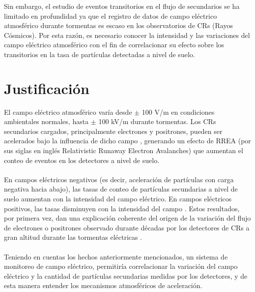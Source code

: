 \documentclass[12pt,a4paper,oneside]{book}
\begin{document}
Sin embargo, el estudio de eventos transitorios en el flujo de secundarios se ha limitado en profundidad ya que el registro de datos de campo eléctrico atmosférico durante tormentas es escaso en los observatorios de CRs (Rayos Cósmicos). Por esta razón, es necesario conocer la intensidad y las variaciones del campo eléctrico atmosférico con el fin de correlacionar su efecto sobre los transitorios en la tasa de partículas detectadas a nivel de suelo.


 
\newpage 
\chapter{Justificación}
El campo eléctrico atmosférico varía desde $\pm$ 100 V/m en condiciones ambientales normales, hasta $\pm$ 100 kV/m durante tormentas. Los CRs secundarios cargados, principalmente electrones y positrones, pueden ser acelerados bajo la influencia de dicho campo \cite{macgorman1998electrical,marshall2005observed}, generando un efecto de RREA (por sus siglas en inglés Relativistic Runaway Electron Avalanches) \cite{dwyer2011low} que aumentan el conteo de eventos en los detectores a nivel de suelo.\\\\
En campos eléctricos negativos (es decir, aceleración de partículas con carga negativa hacia abajo), las tasas de conteo de partículas secundarias a nivel de suelo aumentan con la intensidad del campo eléctrico. En campos eléctricos positivos, las tasas disminuyen con la intensidad del campo \cite{dorman2013cosmic}. Estos resultados, por primera vez, dan una explicación coherente del origen de la variación del flujo de electrones o positrones observado durante décadas por los detectores de CRs a gran altitud durante las tormentas eléctricas \cite{Marteau-etal2012}.\\\\
Teniendo en cuentas los hechos anteriormente mencionados, un sistema de monitoreo de campo eléctrico, permitiría correlacionar la variación del campo eléctrico y la cantidad de partículas secundarias medidas por los detectores, y de esta manera entender los mecanismos atmosféricos de aceleración. 
\end{document}
